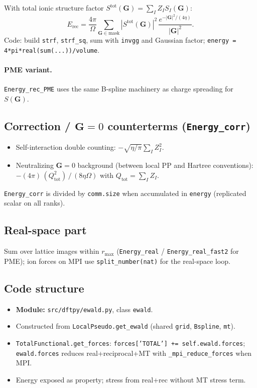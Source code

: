 \documentclass[11pt,a4paper]{article}
\begin{document}
With total ionic structure factor $S^{\mathrm{tot}}(\mathbf G)=\sum_I Z_I S_I(\mathbf G)$:
\begin{equation}
  E_{\mathrm{rec}} = \frac{4\pi}{\Omega}\sum_{\mathbf G\in\mathrm{mask}}
  |S^{\mathrm{tot}}(\mathbf G)|^2\,
  \frac{e^{-|\mathbf G|^2/(4\eta)}}{|\mathbf G|^2}.
\end{equation}
Code: build \texttt{strf}, \texttt{strf\_sq}, sum with \texttt{invgg} and Gaussian factor;
\texttt{energy = 4*pi*real(sum(...))/volume}.

\paragraph{PME variant.}
\texttt{Energy\_rec\_PME} uses the same B-spline machinery as charge spreading for $S(\mathbf G)$.

\subsection{Correction / $\mathbf G=0$ counterterms (\texttt{Energy\_corr})}

\begin{itemize}
  \item Self-interaction double counting: $-\sqrt{\eta/\pi}\sum_I Z_I^2$.
  \item Neutralizing $\mathbf G=0$ background (between local PP and Hartree conventions):
        $-(4\pi)\,(Q_{\mathrm{tot}}^2)\,/\,(8\eta\Omega)$ with $Q_{\mathrm{tot}}=\sum_I Z_I$.
\end{itemize}
\texttt{Energy\_corr} is divided by \texttt{comm.size} when accumulated in \texttt{energy}
(replicated scalar on all ranks).

\subsection{Real-space part}

Sum over lattice images within $r_{\max}$ (\texttt{Energy\_real} / \texttt{Energy\_real\_fast2} for PME);
ion forces on MPI use \texttt{split\_number(nat)} for the real-space loop.

\subsection{Code structure}

\begin{itemize}
  \item \textbf{Module:} \texttt{src/dftpy/ewald.py}, class \texttt{ewald}.
  \item Constructed from \texttt{LocalPseudo.get\_ewald} (shared \texttt{grid}, \texttt{Bspline}, \texttt{mt}).
  \item \texttt{TotalFunctional.get\_forces}: \texttt{forces['TOTAL'] += self.ewald.forces};
        \texttt{ewald.forces} reduces real+reciprocal+MT with \texttt{\_mpi\_reduce\_forces} when MPI.
  \item Energy exposed as property; stress from real+rec without MT stress term.
\end{itemize}
\end{document}
